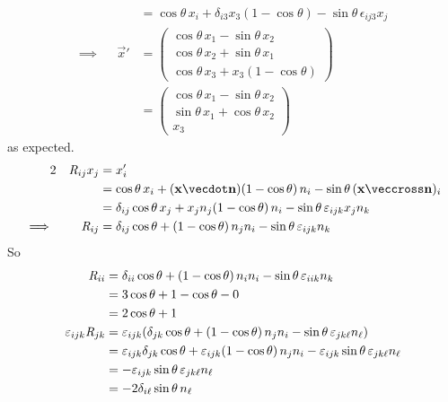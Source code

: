 \documentclass[fleqn,a4paper,11pt]{article}
\begin{document}
\begin{enumerate}[label=\textbf{\arabic*.}]
\begin{alignat*}
     &&      &= \cos \theta\,x_i + \delta_{i3} x_3(1 - \cos \theta) -
                \sin \theta\,\epsilon_{ij3}x_j \\
     \implies{}&& \vec x'
      &=
      \begin{pmatrix}
       \cos\theta\,x_1 - \sin\theta\,x_2 \\
       \cos\theta\,x_2 + \sin\theta\,x_1 \\
       \cos\theta\,x_3 + x_3(1 - \cos\theta)
      \end{pmatrix} \\
     && &=
      \begin{pmatrix}
       \cos\theta\,x_1 - \sin\theta\,x_2 \\
       \sin\theta\,x_1 + \cos\theta\,x_2 \\
       x_3
      \end{pmatrix}
    \end{alignat*}
    as expected.
    \begin{alignat*}2
     && \mat R_{ij} x_j &= x_i' \\
     && &= \cos\theta\,x_i + (\vec x \vecdot \vec n)(1 - \cos\theta)\,n_i
           - \sin\theta\,(\vec x \veccross \vec n)_i \\
     && &= \delta_{ij} \cos\theta\,x_j + x_j n_j (1 - \cos\theta)\,n_i
           - \sin\theta\,\epsilon_{ijk}x_j n_k \\
     \implies{}&&
      \mat R_{ij} &= \delta_{ij} \cos\theta + (1 - \cos\theta)\,n_j n_i
                     - \sin\theta\,\epsilon_{ijk}n_k
    \end{alignat*}
    So
    \begin{align*}
     \mat R_{ii} &= \delta_{ii} \cos\theta + (1 - \cos\theta)\,n_i n_i
                    - \sin\theta\,\epsilon_{iik}n_k \\
      &= 3\cos \theta + 1 - \cos \theta - 0 \\
      &= 2 \cos \theta + 1 \\
     \epsilon_{ijk} \mat R_{jk}
      &= \epsilon_{ijk} (\delta_{jk} \cos \theta + (1 - \cos \theta)\,n_j n_i
                         - \sin\theta\,\epsilon_{jk\ell} n_\ell) \\
      &= \epsilon_{ijk} \delta_{jk} \cos \theta +
          \epsilon_{ijk} (1 - \cos \theta)\,n_j n_i -
          \epsilon_{ijk} \sin\theta\,\epsilon_{jk\ell} n_\ell \\
      &= - \epsilon_{ijk} \sin\theta\,\epsilon_{jk\ell} n_\ell \\
      &= - 2\delta_{i\ell} \sin\theta\,n_\ell \\

\end{align*}
\end{enumerate}
\end{document}
